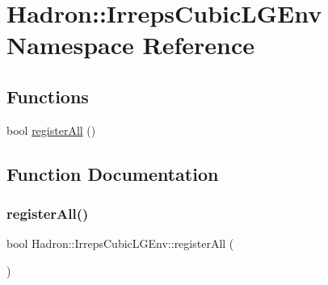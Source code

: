\hypertarget{namespaceHadron_1_1IrrepsCubicLGEnv}{}\section{Hadron\+:\+:Irreps\+Cubic\+L\+G\+Env Namespace Reference}
\label{namespaceHadron_1_1IrrepsCubicLGEnv}
\subsection*{Functions}
\begin{DoxyCompactItemize}
\item 
bool \mbox{\hyperlink{namespaceHadron_1_1IrrepsCubicLGEnv_a4c9a3cd2351dacf5ec8f2f58df4b7e3a}{register\+All}} ()
\end{DoxyCompactItemize}


\subsection{Function Documentation}
\mbox{\label{namespaceHadron_1_1IrrepsCubicLGEnv_a4c9a3cd2351dacf5ec8f2f58df4b7e3a}} 
\subsubsection{\texorpdfstring{registerAll()}{registerAll()}}
{\footnotesize\ttfamily bool Hadron\+::\+Irreps\+Cubic\+L\+G\+Env\+::register\+All (\begin{DoxyParamCaption}{ }\end{DoxyParamCaption})}


